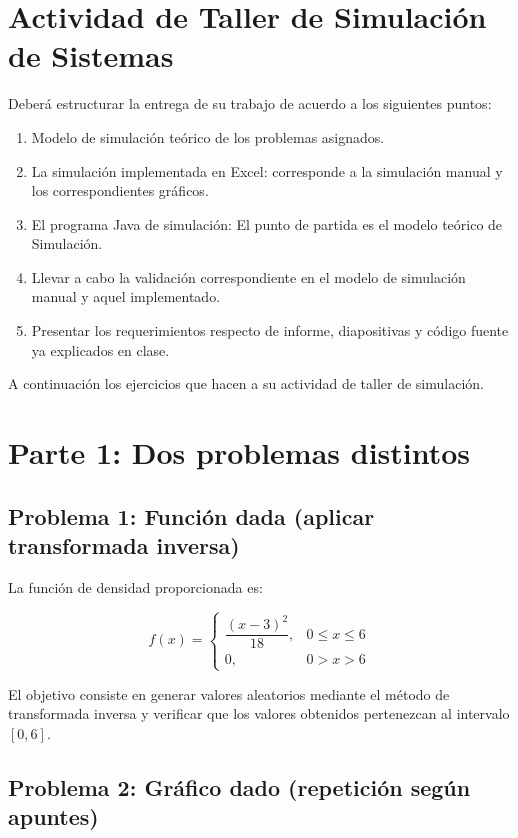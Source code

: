 \documentclass[12pt]{article}
\begin{document}
\section*{Actividad de Taller de Simulación de Sistemas}

Deberá estructurar la entrega de su trabajo de acuerdo a los siguientes puntos:
\begin{enumerate}
    \item Modelo de simulación teórico de los problemas asignados.
    \item La simulación implementada en Excel: corresponde a la simulación manual y los correspondientes gráficos.
    \item El programa Java de simulación: El punto de partida es el modelo teórico de Simulación.
    \item Llevar a cabo la validación correspondiente en el modelo de simulación manual y aquel implementado.
    \item Presentar los requerimientos respecto de informe, diapositivas y código fuente ya explicados en clase.
\end{enumerate}

A continuación los ejercicios que hacen a su actividad de taller de simulación.

\section{Parte 1: Dos problemas distintos}

\subsection{Problema 1: Función dada (aplicar transformada inversa)}

La función de densidad proporcionada es:

\[
f(x)=
\begin{cases}
\dfrac{(x-3)^2}{18}{}, & 0 \leq x \leq 6 \\
0, & 0 > x > 6
\end{cases}
\]

El objetivo consiste en generar valores aleatorios mediante el método de transformada inversa y verificar que los valores obtenidos pertenezcan al intervalo $[0,6]$.

\subsection{Problema 2: Gráfico dado (repetición según apuntes)}
\end{document}
